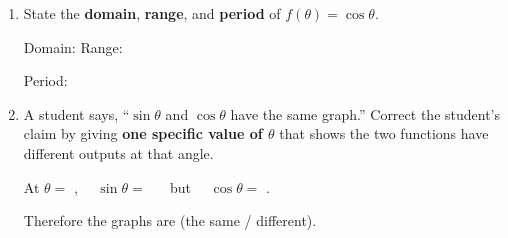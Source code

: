 \documentclass[10pt]{article}
\begin{document}
\namedateperiod

\vspace{0.15in}

\begin{enumerate}[leftmargin=1.5em, itemsep=14pt]

  \item State the \textbf{domain}, \textbf{range}, and \textbf{period} of
        $f(\theta) = \cos\theta$.

        \vspace{4pt}
        Domain:  \quad Range: \ans{$[-1,\,1]$}

        \vspace{8pt}
        Period: \ans{$2\pi$}

  \item A student says, ``$\sin\theta$ and $\cos\theta$ have the same graph.''
        Correct the student's claim by giving \textbf{one specific value of $\theta$}
        that shows the two functions have different outputs at that angle.

        \vspace{6pt}
        At $\theta = $ , $\quad \sin\theta = $ 
        $\quad$ but $\quad \cos\theta = $ .

        \vspace{8pt}
        Therefore the graphs are  (the same / different).

        \vspace{6pt}

\end{enumerate}
\end{document}
